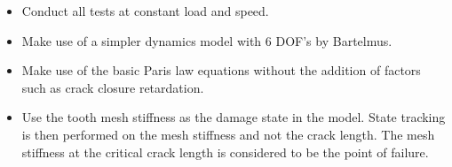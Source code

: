 \begin{itemize}
	\item Conduct all tests at constant load and speed.
	\item Make use of a simpler dynamics model with 6 DOF's by Bartelmus. 
	\item Make use of the basic Paris law equations without the addition of factors such as crack closure retardation. 
	\item Use the tooth mesh stiffness as the damage state in the model. State tracking is then performed on the mesh stiffness and not the crack length. The mesh stiffness at the critical crack length is considered to be the point of failure.
\end{itemize}






